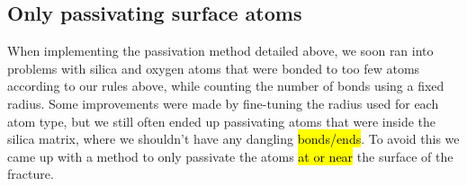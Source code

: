 
\subsection{Only passivating surface atoms}
When implementing the passivation method detailed above, we soon ran into problems with silica and oxygen atoms that were bonded to too few atoms according to our rules above, while counting the number of bonds using a fixed radius. Some improvements were made by fine-tuning the radius used for each atom type, but we still often ended up passivating atoms that were inside the silica matrix, where we shouldn't have any dangling \hl{bonds/ends}. To avoid this we came up with a method to only passivate the atoms \hl{at or near} the surface of the fracture.

